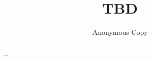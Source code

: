 \documentclass{llncs}
\begin{document}
%
\title{TBD}
%
\author{Anonymous Copy}
%

\maketitle              %

\begin{abstract}
\dots
\keywords{\dots}
\end{abstract}
%





\cite{de2001towards}

%
%


\end{document}
